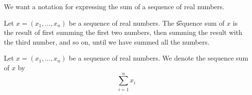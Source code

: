 

We want a notation for expressing the sum of a sequence of real numbers.


Let $x = (x_1, \dots, x_n)$ be a sequence of real numbers.
The \t{sequence sum} of $x$ is the result of first summing the first two numbers, then summing the result with the third number, and so on, until we have summed all the numbers.


Let $x = (x_1, \dots, x_n)$ be a sequence of real numbers.
We denote the sequence sum of $x$ by
\[
  \sum_{i = 1}^{n} x_i
\]

\blankpage

